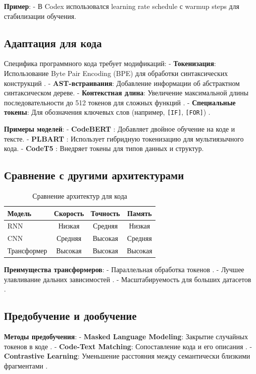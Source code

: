 \documentclass[14pt]{article}
\theoremstyle{definition}
\begin{document}
\textbf{Пример}:
- В Codex \cite{chen2021codex} использовался learning rate schedule с warmup steps для стабилизации обучения.

\subsection{Адаптация для кода}
Специфика программного кода требует модификаций:
- \textbf{Токенизация}: Использование Byte Pair Encoding (BPE) для обработки синтаксических конструкций \cite{zhu2022}.
- \textbf{AST-встраивания}: Добавление информации об абстрактном синтаксическом дереве.
- \textbf{Контекстная длина}: Увеличение максимальной длины последовательности до 512 токенов для сложных функций \cite{chen2023}.
- \textbf{Специальные токены}: Для обозначения ключевых слов (например, \texttt{[IF]}, \texttt{[FOR]}) \cite{wan2023codet5+}.

\textbf{Примеры моделей}:
- \textbf{CodeBERT} \cite{feng2020codebert}: Добавляет двойное обучение на коде и тексте.
- \textbf{PLBART} \cite{ahmad2021plbart}: Использует гибридную токенизацию для мультиязычного кода.
- \textbf{CodeT5} \cite{wang2021codet5}: Внедряет токены для типов данных и структур.

\subsection{Сравнение с другими архитектурами}
\begin{table}[h]
\centering
\begin{tabular}{|l|c|c|c|}
\hline
\textbf{Модель} & \textbf{Скорость} & \textbf{Точность} & \textbf{Память} \\ \hline
RNN & Низкая & Средняя & Низкая \\ 
CNN & Средняя & Высокая & Средняя \\ 
Трансформер & Высокая & Высокая & Высокая \\ \hline
\end{tabular}
\caption{Сравнение архитектур для кода \cite{liu2022survey}}
\end{table}

\textbf{Преимущества трансформеров}:
- Параллельная обработка токенов \cite{karampatsis2020big}.
- Лучшее улавливание дальних зависимостей \cite{liu2022survey}.
- Масштабируемость для больших датасетов \cite{karampatsis2020big}.

\subsection{Предобучение и дообучение}
\textbf{Методы предобучения}:
- \textbf{Masked Language Modeling}: Закрытие случайных токенов в коде \cite{feng2020codebert}.
- \textbf{Code-Text Matching}: Сопоставление кода и его описания \cite{lu2021codexglue}.
- \textbf{Contrastive Learning}: Уменьшение расстояния между семантически близкими фрагментами \cite{wan2023codet5+}.
\end{document}
